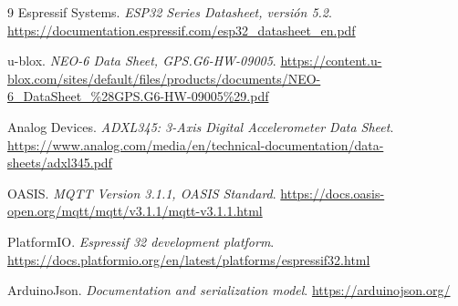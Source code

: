 \documentclass[11pt,a4paper,oneside]{report}
\begin{document}
\begin{thebibliography}{9}
 Espressif Systems. \emph{ESP32 Series Datasheet, versión 5.2}.
\url{https://documentation.espressif.com/esp32_datasheet_en.pdf}

 u-blox. \emph{NEO-6 Data Sheet, GPS.G6-HW-09005}.
\url{https://content.u-blox.com/sites/default/files/products/documents/NEO-6_DataSheet_%28GPS.G6-HW-09005%29.pdf}

 Analog Devices. \emph{ADXL345: 3-Axis Digital Accelerometer Data Sheet}.
\url{https://www.analog.com/media/en/technical-documentation/data-sheets/adxl345.pdf}

 OASIS. \emph{MQTT Version 3.1.1, OASIS Standard}.
\url{https://docs.oasis-open.org/mqtt/mqtt/v3.1.1/mqtt-v3.1.1.html}

 PlatformIO. \emph{Espressif 32 development platform}.
\url{https://docs.platformio.org/en/latest/platforms/espressif32.html}

 ArduinoJson. \emph{Documentation and serialization model}.
\url{https://arduinojson.org/}
\end{thebibliography}
\end{document}
